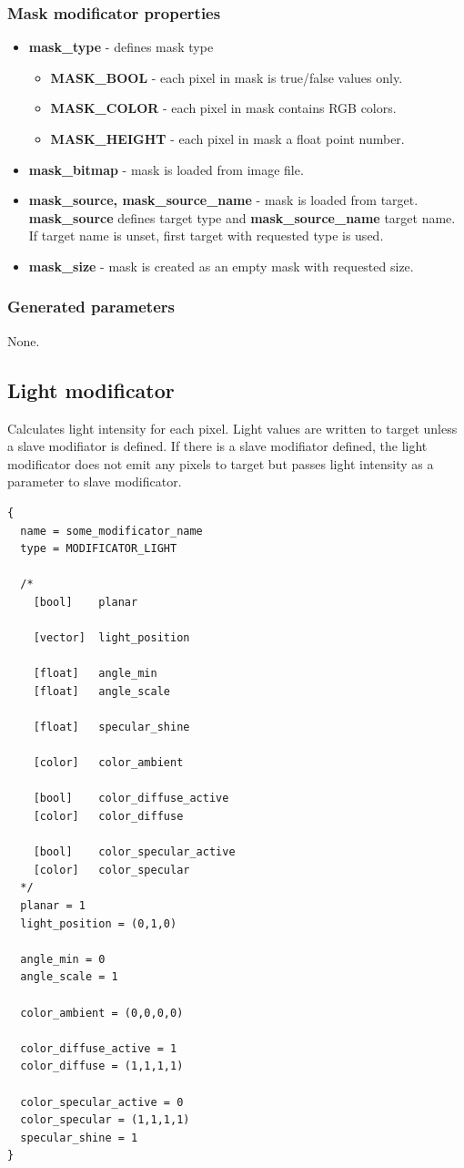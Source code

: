 \documentclass[9pt]{article}
\begin{document}
\subsubsection*{Mask modificator properties}
\begin{itemize}
\item{\bf mask\_type} - defines mask type
\begin{itemize}
\item{\bf MASK\_BOOL} - each pixel in mask is true/false values only.
\item{\bf MASK\_COLOR} - each pixel in mask contains RGB colors.
\item{\bf MASK\_HEIGHT} - each pixel in mask a float point number.
\end{itemize}
\item{\bf mask\_bitmap} - mask is loaded from image file.
\item{\bf mask\_source, mask\_source\_name} - mask is loaded from target. 
{\bf mask\_source} defines target type and {\bf mask\_source\_name} target name. 
If target name is unset, first target with requested type is used.
\item{\bf mask\_size} - mask is created as an empty mask with requested size.
\end{itemize}

\subsubsection*{Generated parameters}

None.

\subsection{Light modificator}

Calculates light intensity for each pixel. Light values are written to target 
unless a slave modifiator is defined. If there is a slave modifiator defined, the
light modificator does not emit any pixels to target but passes light intensity as 
a parameter to slave modificator.

\begin{verbatim}
{
  name = some_modificator_name
  type = MODIFICATOR_LIGHT

  /*      
    [bool]    planar
      
    [vector]  light_position
      
    [float]   angle_min
    [float]   angle_scale
      
    [float]   specular_shine
      
    [color]   color_ambient
      
    [bool]    color_diffuse_active
    [color]   color_diffuse
      
    [bool]    color_specular_active
    [color]   color_specular
  */
  planar = 1
  light_position = (0,1,0)
  
  angle_min = 0
  angle_scale = 1
  
  color_ambient = (0,0,0,0)
  
  color_diffuse_active = 1
  color_diffuse = (1,1,1,1)
  
  color_specular_active = 0
  color_specular = (1,1,1,1)
  specular_shine = 1
}
\end{verbatim}
\end{document}
